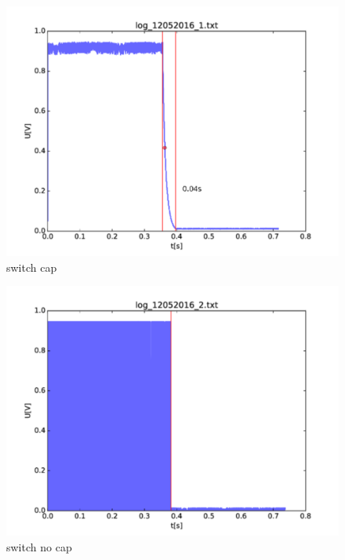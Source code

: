 \begin{figure}
	\begin{center}
		\includegraphics[width=\textwidth]{images/switch_cap.pdf} 
		\caption{switch cap}
	\end{center}
\end{figure}

\begin{figure}
	\begin{center}
		\includegraphics[width=\textwidth]{images/switch_nocap.pdf} 
		\caption{switch no cap}
	\end{center}
\end{figure}
